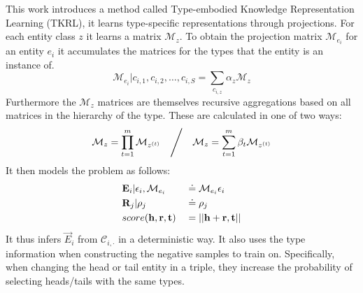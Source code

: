 This work introduces a method called Type-embodied Knowledge Representation Learning (TKRL), it learns type-specific representations through projections. For each entity class $z$ it learns a matrix $\mathcal{M}_z$. To obtain the projection matrix $\mathcal{M}_{e_i}$ for an entity $e_i$ it accumulates the matrices for the types that the entity is an instance of.
\begin{equation}
    \mathcal{M}_{e_i} | c_{i,1}, c_{i,2}, \dots, c_{i,S} = \sum_{c_{i,z}} \alpha_z \mathcal{M}_{z}
\end{equation}
%
Furthermore the $\mathcal{M}_z$ matrices are themselves recursive aggregations based on all matrices in the hierarchy of the type. These are calculated in one of two ways:
\begin{equation} 
    \left. \mathcal{M}_z = \prod_{t=1}^m \mathcal{M}_{z^{(t)}} 
   \hspace{1em} \middle/ \hspace{1em} 
   \mathcal{M}_z = \sum_{t=1}^m  \beta_t \mathcal{M}_{z^{(t)}} \right.
\end{equation}
%
It then models the problem as follows:
\begin{align}
    & \vec{E}_i | \epsilon_i, \mathcal{M}_{e_i}
&& \simpnt  \mathcal{M}_{e_i} \epsilon_i \\
%
    & \vec{R}_j | \rho_j && \simpnt \rho_j \\
%
    & score(\vec{h}, \vec{r}, \vec{t}) && = || \vec{h} + \vec{r}, \vec{t} ||
\end{align}
%
It thus infers $\vec{E}_i$ from $\mathcal{C}_{i,\cdot}$ in a deterministic way. It also uses the type information when constructing the negative samples to train on. Specifically, when changing the head or tail entity in a triple, they increase the probability of selecting heads/tails with the same types.


